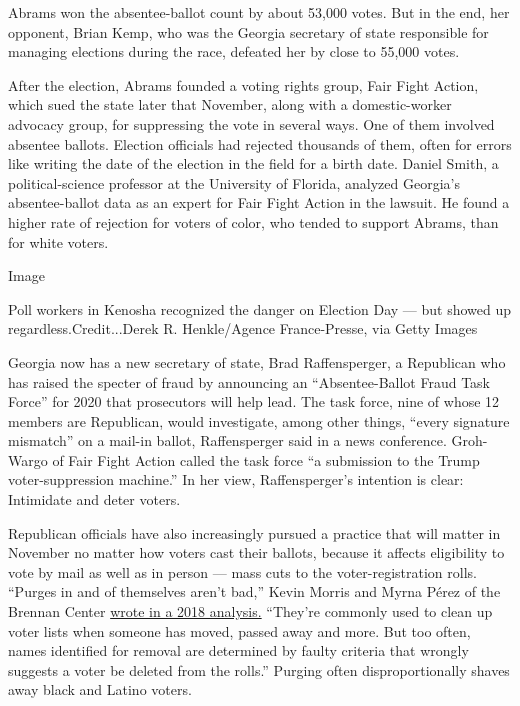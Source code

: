 Abrams won the absentee-ballot count by about 53,000 votes. But in the
end, her opponent, Brian Kemp, who was the Georgia secretary of state
responsible for managing elections during the race, defeated her by
close to 55,000 votes.

After the election, Abrams founded a voting rights group, Fair Fight
Action, which sued the state later that November, along with a
domestic-worker advocacy group, for suppressing the vote in several
ways. One of them involved absentee ballots. Election officials had
rejected thousands of them, often for errors like writing the date of
the election in the field for a birth date. Daniel Smith, a
political-science professor at the University of Florida, analyzed
Georgia's absentee-ballot data as an expert for Fair Fight Action in the
lawsuit. He found a higher rate of rejection for voters of color, who
tended to support Abrams, than for white voters.

Image

Poll workers in Kenosha recognized the danger on Election Day --- but
showed up regardless.Credit...Derek R. Henkle/Agence France-Presse, via
Getty Images

Georgia now has a new secretary of state, Brad Raffensperger, a
Republican who has raised the specter of fraud by announcing an
``Absentee-Ballot Fraud Task Force'' for 2020 that prosecutors will help
lead. The task force, nine of whose 12 members are Republican, would
investigate, among other things, ``every signature mismatch'' on a
mail-in ballot, Raffensperger said in a news conference. Groh-Wargo of
Fair Fight Action called the task force ``a submission to the Trump
voter-suppression machine.'' In her view, Raffensperger's intention is
clear: Intimidate and deter voters.

Republican officials have also increasingly pursued a practice that will
matter in November no matter how voters cast their ballots, because it
affects eligibility to vote by mail as well as in person --- mass cuts
to the voter-registration rolls. ``Purges in and of themselves aren't
bad,'' Kevin Morris and Myrna Pérez of the Brennan Center
\href{https://www.brennancenter.org/our-work/analysis-opinion/florida-georgia-north-carolina-still-purging-voters-high-rates}{wrote
in a 2018 analysis.} ``They're commonly used to clean up voter lists
when someone has moved, passed away and more. But too often, names
identified for removal are determined by faulty criteria that wrongly
suggests a voter be deleted from the rolls.'' Purging often
disproportionally shaves away black and Latino voters.


